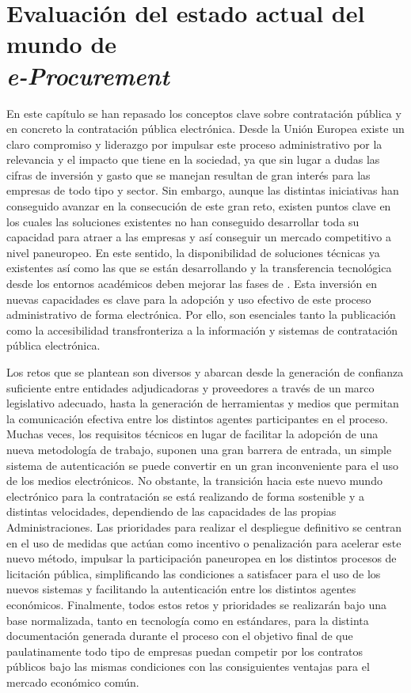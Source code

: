 \section{Evaluación del estado actual del mundo de\\ \textit{e-Procurement}}
En este capítulo se han repasado los conceptos clave sobre contratación
pública y en concreto la contratación pública electrónica. Desde la
Unión Europea existe un claro compromiso y liderazgo por impulsar este proceso
administrativo por la relevancia y el impacto que tiene en la sociedad, ya que sin lugar a dudas las cifras de inversión y gasto que se manejan
resultan de gran interés para las empresas de todo tipo y sector. Sin embargo, aunque las distintas iniciativas han conseguido avanzar en la 
consecución de este gran reto, existen puntos clave en los cuales las soluciones existentes no han
conseguido desarrollar toda su capacidad para atraer a las empresas
y así conseguir un mercado competitivo a nivel paneuropeo. En este sentido,
la disponibilidad de soluciones técnicas ya existentes así como las que
se están desarrollando y la transferencia tecnológica desde los entornos
académicos deben mejorar las fases de \eproc. Esta inversión
en nuevas capacidades es clave para la adopción y uso efectivo de este proceso administrativo
de forma electrónica. Por ello, son esenciales tanto la publicación como la accesibilidad transfronteriza
a la información y sistemas de contratación pública electrónica. 

Los retos que se plantean son diversos y abarcan desde la generación de confianza suficiente
entre entidades adjudicadoras y proveedores a través de un marco legislativo adecuado, hasta
la generación de herramientas y medios que permitan la comunicación efectiva entre los distintos
agentes participantes en el proceso. Muchas veces, los requisitos técnicos en lugar de facilitar
la adopción de una nueva metodología de trabajo, suponen una gran barrera de entrada, un simple sistema de autenticación se puede
convertir en un gran inconveniente para el uso de los medios electrónicos. No obstante,
la transición hacia este nuevo mundo electrónico para la contratación se está realizando
de forma sostenible y a distintas velocidades, dependiendo de las capacidades de las propias
Administraciones. Las prioridades para realizar el despliegue definitivo se centran en el uso
de medidas que actúan como incentivo o penalización para acelerar este nuevo método, impulsar
la participación paneuropea en los distintos procesos de licitación pública, simplificando 
las condiciones a satisfacer para el uso de los nuevos sistemas y facilitando la autenticación
entre los distintos agentes económicos. Finalmente, todos estos retos y prioridades se realizarán
bajo una base normalizada, tanto en tecnología como en estándares, para la distinta documentación
generada durante el proceso con el objetivo final de que paulatinamente todo tipo de empresas
puedan competir por los contratos públicos bajo las mismas condiciones con las consiguientes
ventajas para el mercado económico común.


